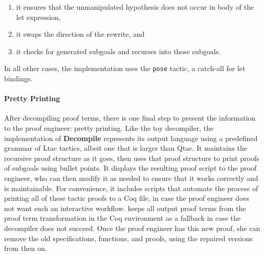 \begin{enumerate}
\item it ensures that the unmanipulated hypothesis does not occur in body of the let expression,
\item it swaps the direction of the rewrite, and
\item it checks for generated subgoals and recurses into those subgoals.
\end{enumerate}
In all other cases, the implementation uses the \lstinline{pose} tactic, a catch-all for let bindings.

\paragraph{Pretty Printing}
After decompiling proof terms, there is one final step to present the information to the proof engineer: pretty printing.
Like the toy decompiler, the implementation of \textbf{Decompile} represents its output language using a predefined grammar of Ltac tactics,
albeit one that is larger than Qtac.
It maintains the recursive proof structure as it goes, then uses that proof structure to print proofs of subgoals using bullet points.
It displays the resulting proof script to the proof engineer, who can then modify it as needed to ensure that it works correctly
and is maintainable.
For convenience, it includes scripts that automate the process of printing all of these tactic proofs to a Coq file,
in case the proof engineer does not want such an interactive workflow.
\toolname keeps all output proof terms from the proof term transformation in the Coq environment as a fallback in case the decompiler does not succeed.
Once the proof engineer has this new proof, she can remove the old specifications, functions, and proofs, using the repaired
versions from then on.


